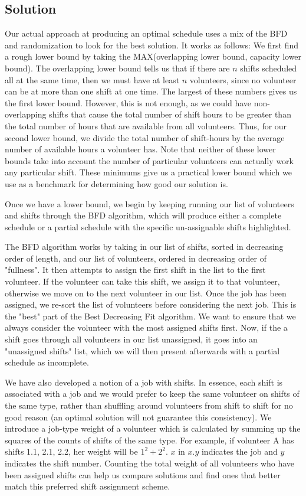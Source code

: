 \documentclass[11pt]{article}
\theoremstyle{definition}
\begin{document}
\begin{multicols}{2}
\section{Solution}

Our actual approach at producing an optimal schedule uses a mix of the BFD and randomization to look for the best solution.
It works as follows:
We first find a rough lower bound by taking the MAX(overlapping lower bound, capacity lower bound). The overlapping lower bound tells us that if there are $n$ shifts scheduled all at the same time, then we must have at least $n$ volunteers, since no volunteer can be at more than one shift at one time. The largest of these numbers gives us the first lower bound.
However, this is not enough, as we could have non-overlapping shifts that cause the total number of shift hours to be greater than the total number of hours that are available from all volunteers.
Thus, for our second lower bound, we divide the total number of shift-hours by the average number of available hours a volunteer has. Note that neither of these lower bounds take into account the number of particular volunteers can actually work any particular shift.
These minimums give us a practical lower bound which we use as a benchmark for determining how good our solution is.

Once we have a lower bound, we begin by keeping running our list of volunteers and shifts through the BFD algorithm, which will produce either a complete schedule or a partial schedule with the specific un-assignable shifts highlighted.

The BFD algorithm works by taking in our list of shifts, sorted in decreasing order of length, and our list of volunteers, ordered in decreasing order of "fullness".
It then attempts to assign the first shift in the list to the first volunteer. If the volunteer can take this shift, we assign it to that volunteer, otherwise we move on to the next volunteer in our list.
Once the job has been assigned, we re-sort the list of volunteers before considering the next job.
This is the "best" part of the Best Decreasing Fit algorithm.
We want to ensure that we always consider the volunteer with the most assigned shifts first.
Now, if the a shift goes through all volunteers in our list unassigned, it goes into an "unassigned shifts" list, which we will then present afterwards with a partial schedule as incomplete.

We have also developed a notion of a job with shifts.
In essence, each shift is associated with a job and we would prefer to keep the same volunteer on shifts of the same type, rather than shuffling around volunteers from shift to shift for no good reason (an optimal solution will not guarantee this consistency).
We introduce a job-type weight of a volunteer which is calculated by summing up the squares of the counts of shifts of the same type.
For example, if volunteer A has shifts 1.1, 2.1, 2.2, her weight will be $1^2 + 2^2$.
$x$ in $x.y$ indicates the job and $y$ indicates the shift number.
Counting the total weight of all volunteers who have been assigned shifts can help us compare
solutions and find ones that better match this preferred shift assignment scheme.


\end{multicols}
\end{document}
